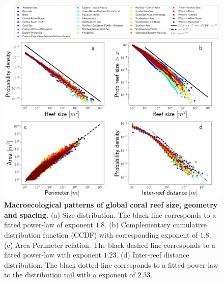 \begin{figure}[H]
    \centering
    \includegraphics[width=\textwidth]{Figures/general_analysis.png}
    \caption[Macroecological patterns of global coral reef size,
        geometry and spacing]{\textbf{Macroecological patterns of global coral
            reef
            size,
            geometry and spacing.} (a) Size distribution. The black line
        corresponds to a
        fitted power-law of exponent $1.8$. (b) Complementary cumulative
        distribution
        function (CCDF) with corresponding exponent of $1.8$. (c)
        Area-Perimeter
        relation. The black dashed line corresponds to a fitted power-law with
        exponent
        $1.23$. (d) Inter-reef distance distribution. The black dotted line
        corresponds
        to a fitted power-law to the distribution tail with a exponent of
        $2.33$.}
    \label{fig:general_analysis}
\end{figure}

